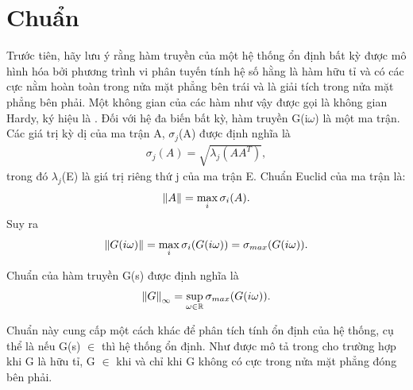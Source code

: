 \section{Chuẩn \hinf}
Trước tiên, hãy lưu ý rằng hàm truyền của một hệ thống ổn định bất kỳ được mô hình hóa bởi phương trình vi phân tuyến tính hệ số hằng là hàm hữu tỉ và có các cực nằm hoàn toàn trong nửa mặt phẳng bên trái và là giải tích trong nửa mặt phẳng bên phải. Một không gian của các hàm như vậy được gọi là không gian Hardy, ký hiệu là \hinf. Đối với hệ đa biến bất kỳ, hàm truyền G(i$\omega$) là một ma trận. Các giá trị kỳ dị của ma trận A, $\sigma_j$(A) được định nghĩa là
\begin{align*}
    \sigma_j(A) = \sqrt{\lambda_j(AA^{T})},
\end{align*}
trong đó $\lambda_j$(E) là giá trị riêng thứ j của ma trận E.
\newline
\newline
Chuẩn Euclid của ma trận là:
\begin{align*}
    \norm{A} = \displaystyle \max_{i}\sigma_i(A).
\end{align*}
Suy ra
\begin{align*}
    \norm{G(i\omega)} = \displaystyle \max_{i}\sigma_i(G(i\omega)) = \sigma_{max}(G(i\omega)).
\end{align*}
\begin{definition}
Chuẩn \hinf của hàm truyền G(s) được định nghĩa là
\begin{align}
    \norm{G}_{\infty} = \sup_{\omega \in \mathbb{R}}\sigma_{max}(G(i\omega)).
\end{align}
\end{definition}
\smallskip
Chuẩn này cung cấp một cách khác để phân tích tính ổn định của hệ thống, cụ thể là nếu G(s) $\in$ \hinf thì hệ thống ổn định. Như được mô tả trong \cite{15} cho trường hợp khi G là hữu tỉ, G $\in$ \hinf khi và chỉ khi G không có cực trong nửa mặt phẳng đóng bên phải.
\newpage
